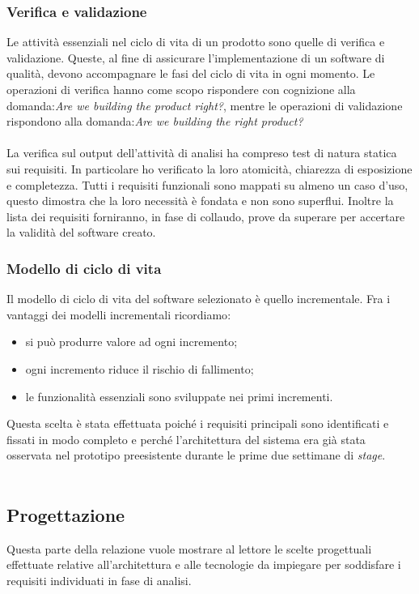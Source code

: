 \subsubsection*{Verifica e validazione}
Le attività essenziali nel ciclo di vita di un prodotto sono quelle di verifica e validazione. Queste, al fine di assicurare l'implementazione di un software di qualità, devono accompagnare le fasi del ciclo di vita in ogni momento. Le operazioni di verifica hanno come scopo rispondere con cognizione alla domanda:\emph{Are we building the product right?}, mentre le operazioni di validazione rispondono alla domanda:\emph{Are we building the right product?}\\\\
La verifica sul output dell'attività di analisi ha compreso test di natura statica sui requisiti. In particolare ho verificato la loro atomicità, chiarezza di esposizione e completezza. Tutti i requisiti funzionali sono mappati su almeno un caso d'uso, questo dimostra che la loro necessità è fondata e non sono superflui. Inoltre la lista dei requisiti forniranno, in fase di collaudo, prove da superare per accertare la validità del software creato.
\subsubsection*{Modello di ciclo di vita}
Il modello di ciclo di vita del software selezionato è quello incrementale. Fra i vantaggi dei modelli incrementali ricordiamo\cite{7}:
\begin{itemize}
\item si può produrre valore ad ogni incremento;
\item ogni incremento riduce il rischio di fallimento;
\item le funzionalità essenziali sono sviluppate nei primi incrementi.
\end{itemize}
Questa scelta è stata effettuata poiché i requisiti principali sono identificati e fissati in modo completo e perché l'architettura del sistema era già stata osservata nel prototipo preesistente durante le prime due settimane di \emph{stage}.\\\\
\subsection{Progettazione}
\label{3.3}
Questa parte della relazione vuole mostrare al lettore le scelte progettuali effettuate relative all'architettura e alle tecnologie da impiegare per soddisfare i requisiti individuati in fase di analisi.

